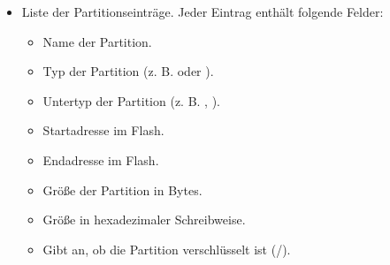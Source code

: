 \documentclass[letterpaper,10pt,english]{sphinxmanual}
\begin{document}
\sphinxAtStartPar
{}
\begin{itemize}
\item {} 
\sphinxAtStartPar
{}  \textendash{} Liste der Partitionseinträge.
Jeder Eintrag enthält folgende Felder:
\begin{itemize}
\item {} 
\sphinxAtStartPar
{}  \textendash{} Name der Partition.

\item {} 
\sphinxAtStartPar
{}  \textendash{} Typ der Partition (z. B.  oder ).

\item {} 
\sphinxAtStartPar
{}  \textendash{} Untertyp der Partition (z. B. , ).

\item {} 
\sphinxAtStartPar
{}  \textendash{} Startadresse im Flash.

\item {} 
\sphinxAtStartPar
{}  \textendash{} Endadresse im Flash.

\item {} 
\sphinxAtStartPar
{}  \textendash{} Größe der Partition in Bytes.

\item {} 
\sphinxAtStartPar
{}  \textendash{} Größe in hexadezimaler Schreibweise.

\item {} 
\sphinxAtStartPar
{}  \textendash{} Gibt an, ob die Partition verschlüsselt ist (/).

\end{itemize}

\end{itemize}
\end{document}
